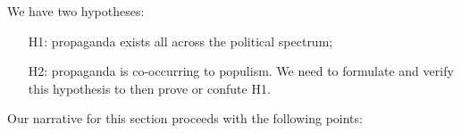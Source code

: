 

We have two hypotheses:
\begin{itemize}
    \item[H1:] propaganda exists all across the political spectrum;
    \item[H2:] propaganda is co-occurring to populism. We need to formulate and verify this hypothesis to then prove or confute H1.
\end{itemize}



Our narrative for this section proceeds with the following points:

